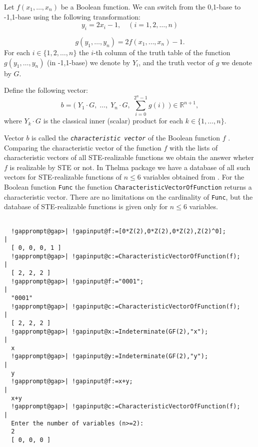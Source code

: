 \documentclass[a4paper,11pt]{report}
\begin{document}
{{{  Let $f(x_1,\ldots,x_n)$ be a Boolean function. We can switch from the
\texttt{}0,1\texttt{}-base to
\texttt{}-1,1\texttt{}-base using the following
transformation: 
\[ y_i = 2x_i-1, \quad (i = 1,2,\ldots,n) \]
 
\[ g(y_1,\ldots,y_n) = 2f(x_1,\ldots,x_n)-1. \]
 For each $i \in \{1,2,\ldots,n\}$ the $i$-th column of the truth table of the function $g(y_1,\ldots,y_n)$ (in \texttt{}-1,1\texttt{}-base) we denote by $Y_i$, and the truth vector of $g$ we denote by $G$.

 Define the following vector: 
\[ b = \big(\;Y_1 \cdot G,\; \ldots, \; Y_n \cdot G, \; \textstyle
\sum_{i=0}^{2^n-1} g(i) \; \big) \in \mathbb{R}^{n+1}, \]
 where $Y_k \cdot G$ is the classical inner (scalar) product for each $k \in \{1,\ldots,n\}$. 

 Vector $b$ is called the \mbox{\texttt{\mdseries\slshape characteristic vector}} of the Boolean function $f$ \cite{Dertouzos65}. Comparing the characteristic vector of the function $f$ with the lists of characteristic vectors of all STE-realizable functions we
obtain the answer wheter $f$ is realizable by STE or not. In \textsf{Thelma} package we have a database of all such vectors for STE-realizable functions of $n \leq 6$ variables obtained from \cite{Dertouzos65}. For the Boolean function \texttt{Func} the function \texttt{CharacteristicVectorOfFunction} returns a characteristic vector. There are no limitations on the cardinality
of \texttt{Func}, but the database of STE-realizable functions is given only for $n \leq 6$ variables. 
\begin{Verbatim}[commandchars=!@|,fontsize=\small,frame=single,label=Example]
  
  !gapprompt@gap>| !gapinput@f:=[0*Z(2),0*Z(2),0*Z(2),Z(2)^0];
|
  [ 0, 0, 0, 1 ]
  !gapprompt@gap>| !gapinput@c:=CharacteristicVectorOfFunction(f);
|
  [ 2, 2, 2 ]
  !gapprompt@gap>| !gapinput@f:="0001";
|
  "0001"
  !gapprompt@gap>| !gapinput@c:=CharacteristicVectorOfFunction(f);
|
  [ 2, 2, 2 ]
  !gapprompt@gap>| !gapinput@x:=Indeterminate(GF(2),"x");
|
  x
  !gapprompt@gap>| !gapinput@y:=Indeterminate(GF(2),"y");
|
  y
  !gapprompt@gap>| !gapinput@f:=x+y;
|
  x+y
  !gapprompt@gap>| !gapinput@c:=CharacteristicVectorOfFunction(f);
|
  Enter the number of variables (n>=2):
  2
  [ 0, 0, 0 ]
  
\end{Verbatim}
 }

 

}}
\end{document}
